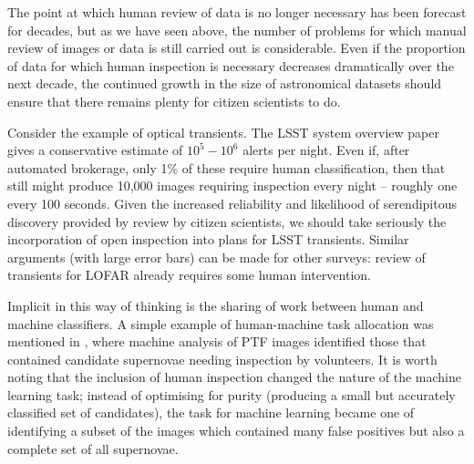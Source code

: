 \documentclass{ar2e}
\begin{document}
The point at which human review of data is no longer necessary has been forecast
for decades, but as we have seen above, the number of problems for which
manual review of images or data is still carried out is considerable. Even if
the proportion of data for which human inspection is necessary decreases
dramatically over the next decade, the continued growth in the size of
astronomical datasets should ensure that there remains plenty for citizen
scientists to do. 

Consider the example of optical transients. The LSST system
overview paper \citep{LSSTsystem} gives a conservative estimate of $10^5-10^6$
alerts per night. Even if, after automated brokerage, only 1\% of these require
human classification, then that still might produce 10,000 images requiring
inspection every night -- roughly one every 100 seconds. Given the increased
reliability and likelihood of serendipitous discovery provided by review by
citizen scientists, we should take seriously the incorporation of open
inspection into plans for LSST transients. Similar arguments (with large error
bars) can be made for other surveys: review of transients for LOFAR
already requires some human intervention. 


Implicit in this way of thinking is the sharing of work between human and
machine classifiers. 
A simple example of human-machine task allocation was mentioned in
, where machine analysis of PTF images identified those
that contained candidate supernovae needing inspection by volunteers. It is
worth noting that the inclusion of human inspection changed the nature of the
machine learning task; instead of optimising for purity (producing a small but
accurately classified set of candidates), the task for machine learning became
one of identifying a subset of the images which contained many false positives
but also a complete set of all supernovae. 
\end{document}

